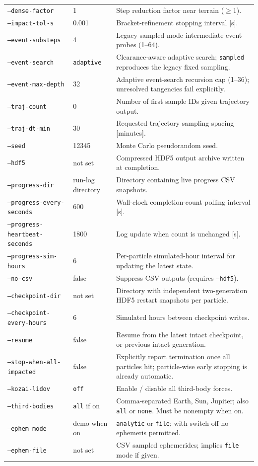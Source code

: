 \documentclass[11pt,a4paper]{article}
\newcommand{\opt}[1]{\texttt{#1}}
\begin{document}
{\begin{longtable}{@{}p{.32\linewidth}p{.22\linewidth}p{.40\linewidth}@{}}
\opt{--dense-factor} & 1 & Step reduction factor near terrain (\(\ge1\)).\\
\opt{--impact-tol-s} & 0.001 & Bracket-refinement stopping interval [s].\\
\opt{--event-substeps} & 4 & Legacy sampled-mode intermediate event probes (1--64).\\
\opt{--event-search} & \opt{adaptive} & Clearance-aware adaptive search; \opt{sampled} reproduces the legacy fixed sampling.\\
\opt{--event-max-depth} & 32 & Adaptive event-search recursion cap (1--36); unresolved tangencies fail explicitly.\\
\opt{--traj-count} & 0 & Number of first sample IDs given trajectory output.\\
\opt{--traj-dt-min} & 30 & Requested trajectory sampling spacing [minutes].\\
\opt{--seed} & 12345 & Monte Carlo pseudorandom seed.\\
\opt{--hdf5} & not set & Compressed HDF5 output archive written at completion.\\
\opt{--progress-dir} & run-log directory & Directory containing live progress CSV snapshots.\\
\opt{--progress-every-seconds} & 600 & Wall-clock completion-count polling interval [s].\\
\opt{--progress-heartbeat-seconds} & 1800 & Log update when count is unchanged [s].\\
\opt{--progress-sim-hours} & 6 & Per-particle simulated-hour interval for updating the latest state.\\
\opt{--no-csv} & false & Suppress CSV outputs (requires \opt{--hdf5}).\\
\opt{--checkpoint-dir} & not set & Directory with independent two-generation HDF5 restart snapshots per particle.\\
\opt{--checkpoint-every-hours} & 6 & Simulated hours between checkpoint writes.\\
\opt{--resume} & false & Resume from the latest intact checkpoint, or previous intact generation.\\
\opt{--stop-when-all-impacted} & false & Explicitly report termination once all particles hit; particle-wise early stopping is already automatic.\\
\opt{--kozai-lidov} & \opt{off} & Enable / disable all third-body forces.\\
\opt{--third-bodies} & \opt{all} if on & Comma-separated Earth, Sun, Jupiter; also \opt{all} or \opt{none}. Must be nonempty when on.\\
\opt{--ephem-mode} & demo when on & \opt{analytic} or \opt{file}; with switch off no ephemeris permitted.\\
\opt{--ephem-file} & not set & CSV sampled ephemerides; implies \opt{file} mode if given.\\
\bottomrule
\end{longtable}}
\end{document}
